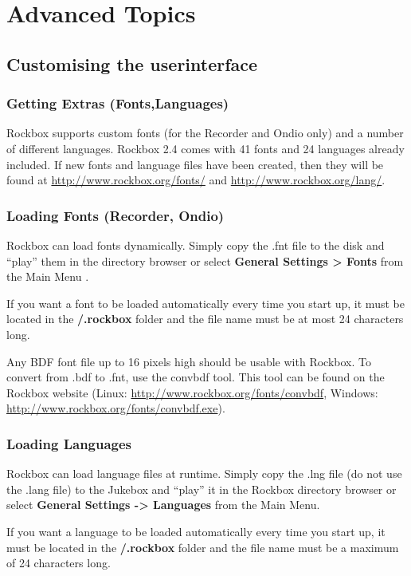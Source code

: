 \chapter{Advanced Topics}
\newpage
\section{\label{ref:CustomisingUI}Customising the userinterface}
\subsection{\label{ref:GettingExtras}Getting Extras (Fonts,Languages)}
Rockbox supports custom fonts (for the Recorder and Ondio only) and a number of different languages. Rockbox 2.4 comes with 41 fonts and 24 languages already included. If new fonts and language files have been created, then they will be found at \url{http://www.rockbox.org/fonts/} and \url{http://www.rockbox.org/lang/}.

\subsection{\label{ref:LoadingForts}Loading Fonts (Recorder, Ondio)}
Rockbox can load fonts dynamically. Simply copy the .fnt file to the
disk and ``play'' them in the directory browser or select \textbf{General Settings {\textgreater} Fonts} from the Main Menu .

If you want a font to be loaded automatically every time you start up,
it must be located in the \textbf{/.rockbox }folder and the file name
must be at most 24 characters long.

Any BDF font file up to 16 pixels high should be usable with Rockbox. To
convert from .bdf to .fnt, use the convbdf tool. This tool can be found
on the Rockbox website 
(Linux: \url{http://www.rockbox.org/fonts/convbdf}, Windows: \url{http://www.rockbox.org/fonts/convbdf.exe}).

\subsection{\label{ref:Loadinglanguages}Loading Languages}
Rockbox can load language files at runtime. Simply copy the .lng file
(do not use the .lang file) to the Jukebox and
``play'' it in the Rockbox directory browser
or select \textbf{General Settings {}-{\textgreater} Languages }from
the Main Menu. 

If you want a language to be loaded automatically every time you start
up, it must be located in the \textbf{/.rockbox }folder and the file
name must be a maximum of 24 characters long.

